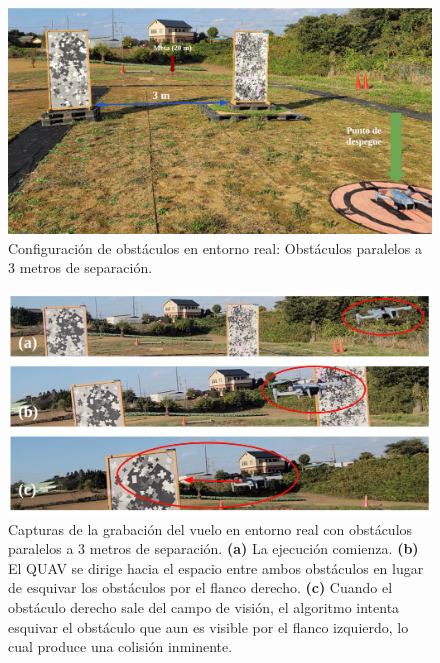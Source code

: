 \begin{figure}[H]
    \centering
    \includegraphics[scale=0.22]{partes/ImgJoao/real-2-parallelA-0-config.png}
    \caption[Configuración de obstáculos en entorno real: Obstáculos paralelos a 3 metros de separación.]{Configuración de obstáculos en entorno real: Obstáculos paralelos a 3 metros de separación.}
    \label{real-2-parallelA-0-config}
\end{figure}

\begin{figure}[H]
    \centering
    \includegraphics[scale=0.25]{partes/ImgJoao/real-2-parallelA-1-frames.png}
    \caption[Capturas de la grabación del vuelo en entorno real con obstáculos paralelos a 3 metros de separación.]{Capturas de la grabación del vuelo en entorno real con obstáculos paralelos a 3 metros de separación. \textbf{(a)} La ejecución comienza. \textbf{(b)} El QUAV se dirige hacia el espacio entre ambos obstáculos en lugar de esquivar los obstáculos por el flanco derecho. \textbf{(c)} Cuando el obstáculo derecho sale del campo de visión, el algoritmo intenta esquivar el obstáculo que aun es visible por el flanco izquierdo, lo cual produce una colisión inminente.}
    \label{real-2-parallelA-1-frames}
\end{figure}

